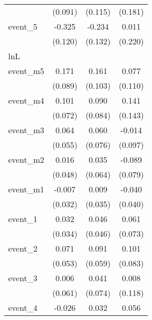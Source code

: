 {\begin{tabular}{l*{3}{c}}
            &     (0.091)         &     (0.115)         &     (0.181)         \\
[1em]
event\_5     &      -0.325\sym{**} &      -0.234         &       0.011         \\
            &     (0.120)         &     (0.132)         &     (0.220)         \\
\hline
lnL         &                     &                     &                     \\
event\_m5    &       0.171         &       0.161         &       0.077         \\
            &     (0.089)         &     (0.103)         &     (0.110)         \\
[1em]
event\_m4    &       0.101         &       0.090         &       0.141         \\
            &     (0.072)         &     (0.084)         &     (0.143)         \\
[1em]
event\_m3    &       0.064         &       0.060         &      -0.014         \\
            &     (0.055)         &     (0.076)         &     (0.097)         \\
[1em]
event\_m2    &       0.016         &       0.035         &      -0.089         \\
            &     (0.048)         &     (0.064)         &     (0.079)         \\
[1em]
event\_m1    &      -0.007         &       0.009         &      -0.040         \\
            &     (0.032)         &     (0.035)         &     (0.040)         \\
[1em]
event\_1     &       0.032         &       0.046         &       0.061         \\
            &     (0.034)         &     (0.046)         &     (0.073)         \\
[1em]
event\_2     &       0.071         &       0.091         &       0.101         \\
            &     (0.053)         &     (0.059)         &     (0.083)         \\
[1em]
event\_3     &       0.006         &       0.041         &       0.008         \\
            &     (0.061)         &     (0.074)         &     (0.118)         \\
[1em]
event\_4     &      -0.026         &       0.032         &       0.056         \\

\end{tabular}}
